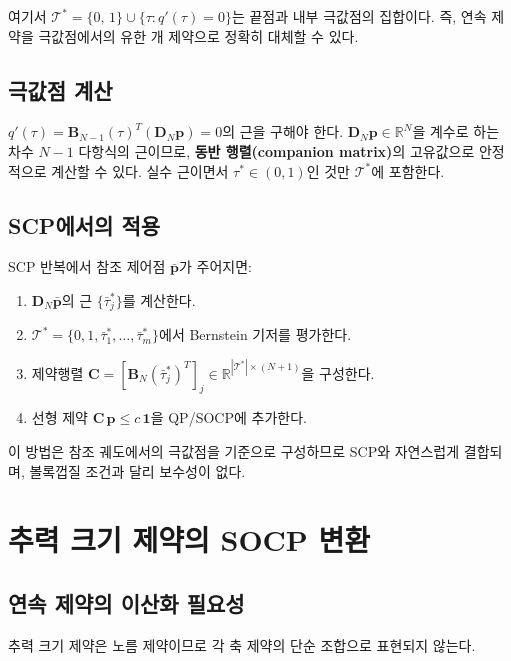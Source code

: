 \documentclass[11pt]{article}
\begin{document}
여기서 $\mathcal{T}^* = \{0,\,1\} \cup \{\tau : q'(\tau) = 0\}$는
끝점과 내부 극값점의 집합이다.
즉, 연속 제약을 극값점에서의 유한 개 제약으로 정확히 대체할 수 있다.

\subsection{극값점 계산}

$q'(\tau) = \mathbf{B}_{N-1}(\tau)^T (\mathbf{D}_N \mathbf{p}) = 0$의 근을 구해야 한다.
$\mathbf{D}_N \mathbf{p} \in \mathbb{R}^N$을 계수로 하는 차수 $N-1$ 다항식의 근이므로,
\textbf{동반 행렬(companion matrix)}의 고유값으로 안정적으로 계산할 수 있다.
실수 근이면서 $\tau^* \in (0,1)$인 것만 $\mathcal{T}^*$에 포함한다.

\subsection{SCP에서의 적용}

SCP 반복에서 참조 제어점 $\bar{\mathbf{p}}$가 주어지면:
\begin{enumerate}
  \item $\mathbf{D}_N \bar{\mathbf{p}}$의 근 $\{\bar{\tau}_j^*\}$를 계산한다.
  \item $\mathcal{T}^* = \{0, 1, \bar{\tau}_1^*, \ldots, \bar{\tau}_m^*\}$에서
        Bernstein 기저를 평가한다.
  \item 제약행렬 $\mathbf{C} = [\mathbf{B}_N(\bar{\tau}^*_j)^T]_j \in \mathbb{R}^{|\mathcal{T}^*|\times(N+1)}$을 구성한다.
  \item 선형 제약 $\mathbf{C}\,\mathbf{p} \leq c\,\mathbf{1}$을 QP/SOCP에 추가한다.
\end{enumerate}

이 방법은 참조 궤도에서의 극값점을 기준으로 구성하므로 SCP와 자연스럽게 결합되며,
볼록껍질 조건과 달리 보수성이 없다.

\section{추력 크기 제약의 SOCP 변환}

\subsection{연속 제약의 이산화 필요성}

추력 크기 제약은 노름 제약이므로 각 축 제약의 단순 조합으로 표현되지 않는다.
\end{document}
